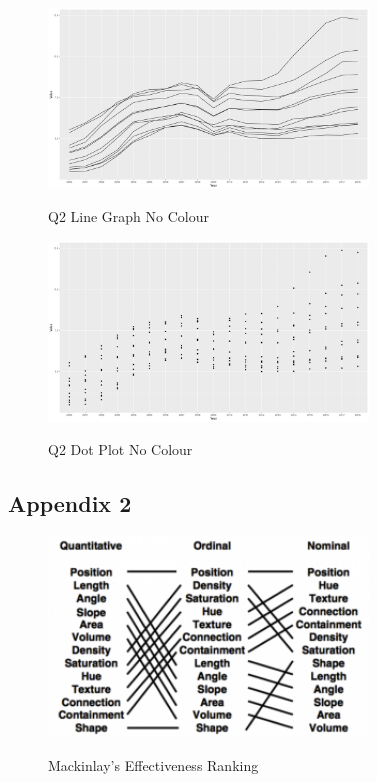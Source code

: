 \documentclass{article}
\begin{document}
\begin{figure}[H]
  \begin{minipage}[b]{1.0\linewidth}
    \centering
    \centerline{\includegraphics[width=8.5cm]{Q2Geom_line_no_colour}}
    \centerline{Q2 Line Graph No Colour}\medskip
  \end{minipage}
\end{figure}

\begin{figure}[H]
  \begin{minipage}[b]{1.0\linewidth}
    \centering
    \centerline{\includegraphics[width=8.5cm]{Q2Geom_point_no_colour}}
    \centerline{Q2 Dot Plot No Colour}\medskip
  \end{minipage}
\end{figure}

\subsection{Appendix 2}
\begin{figure}[H]
  \begin{minipage}[b]{1.0\linewidth}
    \centering
    \centerline{\includegraphics[width=8.5cm]{mackinlayRankings}}
    \centerline{Mackinlay's Effectiveness Ranking}\medskip
  \end{minipage}
\end{figure}
\end{document}
